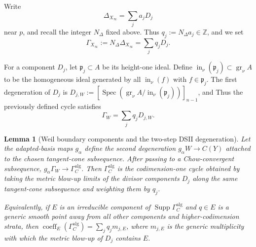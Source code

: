 \documentclass[11pt]{amsart}
\newtheorem{lemma}[theorem]{Lemma}
\theoremstyle{definition}
\theoremstyle{remark}
\begin{document}
Write
\[
\Delta_{X_\infty}=\sum_j a_jD_j
\]
near $p$, and recall the integer $N_\Delta$ fixed above. Thus
$q_j:=N_\Delta a_j\in\mathbb Z$, and we set
\[
\Gamma_{X_\infty}:=N_\Delta\Delta_{X_\infty}
=
\sum_j q_jD_j.
\]

For a component $D_j$, let $\mathfrak p_j\subset A$ be its height-one ideal.
Define $\operatorname{in}_\nu(\mathfrak p_j)\subset\operatorname{gr}_\nu A$ to
be the homogeneous ideal generated by all $\operatorname{in}_\nu(f)$ with
$f\in\mathfrak p_j$. The first degeneration of $D_j$ is
$D_{j,W}:=[\operatorname{Spec}(\operatorname{gr}_\nu A/
\operatorname{in}_\nu(\mathfrak p_j))]_{n-1}$, and
Thus the previously defined cycle satisfies
\[
\Gamma_W=\sum_j q_jD_{j,W}.
\]

\begin{lemma}[Weil boundary components and the two-step DSII degeneration]
\label{lem:weil-boundary-two-step}
Let the adapted-basis maps $g_\alpha$ define the second degeneration
$g_\alpha W\to C(Y)$ attached to the chosen tangent-cone subsequence.
After passing to a Chow-convergent subsequence,
$g_\alpha\Gamma_W\to\Gamma_C^{\mathrm{alg}}$. Then
$\Gamma_C^{\mathrm{alg}}$ is the codimension-one cycle obtained by taking the
metric blow-up limits of the divisor components $D_j$ along the same
tangent-cone subsequence and weighting them by $q_j$.

Equivalently, if $E$ is an irreducible component of
$\operatorname{Supp}\Gamma_C^{\mathrm{alg}}$ and $q\in E$ is a generic smooth
point away from all other components and higher-codimension strata, then
$\operatorname{coeff}_E(\Gamma_C^{\mathrm{alg}})=\sum_j q_jm_{j,E}$, where
$m_{j,E}$ is the generic multiplicity with which the metric blow-up of $D_j$
contains $E$.
\end{lemma}
\end{document}
